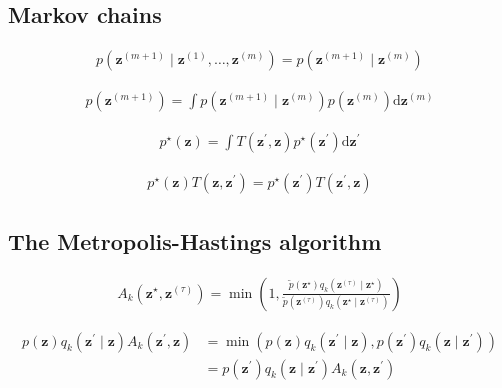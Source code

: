 \documentclass{article}
\begin{document}
\subsection{Markov chains}

\begin{align*}
p\left(\mathbf{z}^{(m+1)} \mid \mathbf{z}^{(1)}, \ldots, \mathbf{z}^{(m)}\right)=p\left(\mathbf{z}^{(m+1)} \mid \mathbf{z}^{(m)}\right) \tag{14.31}
\end{align*}

\begin{align*}
p\left(\mathbf{z}^{(m+1)}\right)=\int p\left(\mathbf{z}^{(m+1)} \mid \mathbf{z}^{(m)}\right) p\left(\mathbf{z}^{(m)}\right) \mathrm{d} \mathbf{z}^{(m)} \tag{14.32}
\end{align*}

\begin{align*}
p^{\star}(\mathbf{z})=\int T\left(\mathbf{z}^{\prime}, \mathbf{z}\right) p^{\star}\left(\mathbf{z}^{\prime}\right) \mathrm{d} \mathbf{z}^{\prime} \tag{14.33}
\end{align*}

\begin{align*}
p^{\star}(\mathbf{z}) T\left(\mathbf{z}, \mathbf{z}^{\prime}\right)=p^{\star}\left(\mathbf{z}^{\prime}\right) T\left(\mathbf{z}^{\prime}, \mathbf{z}\right) \tag{14.34}
\end{align*}

\subsection{The Metropolis-Hastings algorithm}

\begin{align*}
A_{k}\left(\mathbf{z}^{\star}, \mathbf{z}^{(\tau)}\right)=\min \left(1, \frac{\widetilde{p}\left(\mathbf{z}^{\star}\right) q_{k}\left(\mathbf{z}^{(\tau)} \mid \mathbf{z}^{\star}\right)}{\widetilde{p}\left(\mathbf{z}^{(\tau)}\right) q_{k}\left(\mathbf{z}^{\star} \mid \mathbf{z}^{(\tau)}\right)}\right) \tag{14.40}
\end{align*}

\begin{align*}
p(\mathbf{z}) q_{k}\left(\mathbf{z}^{\prime} \mid \mathbf{z}\right) A_{k}\left(\mathbf{z}^{\prime}, \mathbf{z}\right) & =\min \left(p(\mathbf{z}) q_{k}\left(\mathbf{z}^{\prime} \mid \mathbf{z}\right), p\left(\mathbf{z}^{\prime}\right) q_{k}\left(\mathbf{z} \mid \mathbf{z}^{\prime}\right)\right) \\
& =p\left(\mathbf{z}^{\prime}\right) q_{k}\left(\mathbf{z} \mid \mathbf{z}^{\prime}\right) A_{k}\left(\mathbf{z}, \mathbf{z}^{\prime}\right)
 \tag{14.41}
\end{align*}
\end{document}
